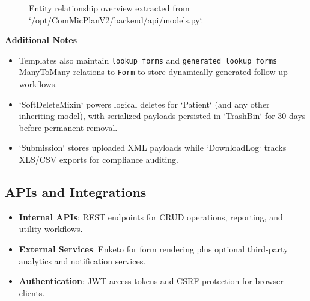 \documentclass[11pt]{article}
\begin{document}
\begin{figure}[H]
{%
  }
  \caption{Entity relationship overview extracted from `/opt/ComMicPlanV2/backend/api/models.py`.}
  \label{fig:erdiagram}
\end{figure}

\noindent\textbf{Additional Notes}
\begin{itemize}[leftmargin=*]
  \item Templates also maintain \texttt{lookup\_forms} and \texttt{generated\_lookup\_forms} ManyToMany relations to \texttt{Form} to store dynamically generated follow-up workflows.
  \item `SoftDeleteMixin` powers logical deletes for `Patient` (and any other inheriting model), with serialized payloads persisted in `TrashBin` for 30 days before permanent removal.
  \item `Submission` stores uploaded XML payloads while `DownloadLog` tracks XLS/CSV exports for compliance auditing.
\end{itemize}

\subsection{APIs and Integrations}
\begin{itemize}[leftmargin=*]
  \item \textbf{Internal APIs}: REST endpoints for CRUD operations, reporting, and utility workflows.
  \item \textbf{External Services}: Enketo for form rendering plus optional third-party analytics and notification services.
  \item \textbf{Authentication}: JWT access tokens and CSRF protection for browser clients.
\end{itemize}
\end{document}
